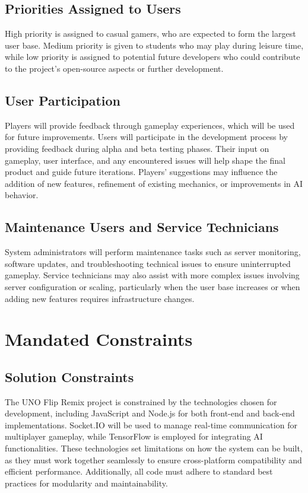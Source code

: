 \documentclass{article}
\begin{document}
\subsection{Priorities Assigned to Users}
High priority is assigned to casual gamers, who are expected to form the largest user base. Medium priority is given to students who may play during leisure time, while low priority is assigned to potential future developers who could contribute to the project’s open-source aspects or further development.

\subsection{User Participation}
Players will provide feedback through gameplay experiences, which will be used for future improvements. Users will participate in the development process by providing feedback during alpha and beta testing phases. Their input on gameplay, user interface, and any encountered issues will help shape the final product and guide future iterations. Players’ suggestions may influence the addition of new features, refinement of existing mechanics, or improvements in AI behavior.

\subsection{Maintenance Users and Service Technicians}
System administrators will perform maintenance tasks such as server monitoring, software updates, and troubleshooting technical issues to ensure uninterrupted gameplay. Service technicians may also assist with more complex issues involving server configuration or scaling, particularly when the user base increases or when adding new features requires infrastructure changes.

\section{Mandated Constraints}

\subsection{Solution Constraints}
The UNO Flip Remix project is constrained by the technologies chosen for development, including JavaScript and Node.js for both front-end and back-end implementations. Socket.IO will be used to manage real-time communication for multiplayer gameplay, while TensorFlow is employed for integrating AI functionalities. These technologies set limitations on how the system can be built, as they must work together seamlessly to ensure cross-platform compatibility and efficient performance. Additionally, all code must adhere to standard best practices for modularity and maintainability.
\end{document}
